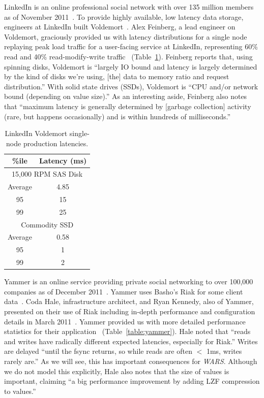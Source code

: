 \documentclass{vldb}
\begin{document}
LinkedIn is an online professional social network with over 135
million members as of November 2011~\cite{linkedin}. To provide highly
available, low latency data storage, engineers at LinkedIn built
Voldemort~\cite{voldemort, voldemortpub}.  Alex Feinberg, a lead
engineer on Voldemort, graciously provided us with latency
distributions for a single node replaying peak load traffic for a
user-facing service at LinkedIn, representing 60\% read and 40\%
read-modify-write traffic~\cite{feinbergpc}
(Table~\ref{table:linkedin}).  Feinberg reports that, using spinning
disks, Voldemort is ``largely IO bound and latency is largely
determined by the kind of disks we're using, [the] data to memory
ratio and request distribution.''  With solid state drives (SSDs),
Voldemort is ``CPU and/or network bound (depending on value size).''
As an interesting aside, Feinberg also notes that ``maximum latency is
generally determined by [garbage collection] activity (rare, but
happens occasionally) and is within hundreds of milliseconds.''

\begin{table}
\centering
\begin{tabular}{|c|c|}
\hline
\%ile & Latency (ms) \\
\hline
\multicolumn{2}{|c|}{ 15,000 RPM SAS Disk}\\
\hline
Average & 4.85\\
95 & 15\\
99 & 25\\
\hline
\multicolumn{2}{|c|}{ Commodity SSD }\\
\hline
Average & 0.58 \\
95 & 1\\
99 & 2\\
\hline
\end{tabular}
\vspace{-6pt}
\caption{LinkedIn Voldemort single-node production latencies.}
\vspace{-12pt}
\label{table:linkedin}
\end{table}

Yammer is an online service providing private social networking to
over 100,000 companies as of December 2011~\cite{yammer}.  Yammer uses
Basho's Riak for some client data~\cite{riak}.  Coda Hale,
infrastructure architect, and Ryan Kennedy, also of Yammer, presented
on their use of Riak including in-depth performance and configuration
details in March 2011~\cite{riakyammer}.  Yammer provided us with more
detailed performance statistics for their application~\cite{codapc}
(Table~\ref{table:yammer}).  Hale noted that ``reads and writes have
radically different expected latencies, especially for Riak.''  Writes
are delayed ``until the fsync returns, so while reads are often $<$
1ms, writes rarely are.''  As we will see, this has important
consequences for \textit{WARS}.  Although we do not model this
explicitly, Hale also notes that the size of values is important,
claiming ``a big performance improvement by adding LZF compression to
values.''
\end{document}
